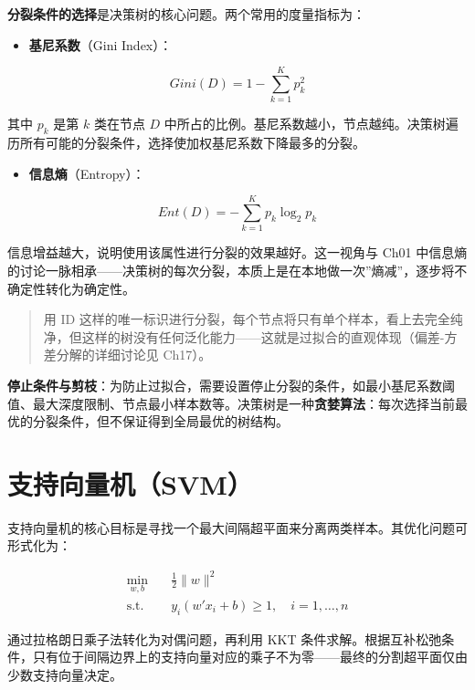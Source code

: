 \documentclass[
]{book}
\providecommand{\tightlist}{%
  \setlength{\itemsep}{0pt}\setlength{\parskip}{0pt}}
\begin{document}
\textbf{分裂条件的选择}是决策树的核心问题。两个常用的度量指标为：

\begin{itemize}
\tightlist
\item
  \textbf{基尼系数}（Gini Index）：
\end{itemize}

\[
Gini(D) = 1 - \sum_{k=1}^{K} p_k^2
\]

其中 \(p_k\) 是第 \(k\) 类在节点 \(D\) 中所占的比例。基尼系数越小，节点越纯。决策树遍历所有可能的分裂条件，选择使加权基尼系数下降最多的分裂。

\begin{itemize}
\tightlist
\item
  \textbf{信息熵}（Entropy）：
\end{itemize}

\[
Ent(D) = -\sum_{k=1}^{K} p_k \log_2 p_k
\]

信息增益越大，说明使用该属性进行分裂的效果越好。这一视角与 Ch01 中信息熵的讨论一脉相承------决策树的每次分裂，本质上是在本地做一次''熵减''，逐步将不确定性转化为确定性。

\begin{quote}
用 ID 这样的唯一标识进行分裂，每个节点将只有单个样本，看上去完全纯净，但这样的树没有任何泛化能力------这就是过拟合的直观体现（偏差-方差分解的详细讨论见 Ch17）。
\end{quote}

\textbf{停止条件与剪枝}：为防止过拟合，需要设置停止分裂的条件，如最小基尼系数阈值、最大深度限制、节点最小样本数等。决策树是一种\textbf{贪婪算法}：每次选择当前最优的分裂条件，但不保证得到全局最优的树结构。

\section{支持向量机（SVM）}\label{ux652fux6301ux5411ux91cfux673asvm}

支持向量机的核心目标是寻找一个最大间隔超平面来分离两类样本。其优化问题可形式化为：

\[
\begin{aligned}
\min_{w, b} \quad & \frac{1}{2} \|w\|^2 \\
\text{s.t.} \quad & y_i (w' x_i + b) \geq 1, \quad i = 1, \ldots, n
\end{aligned}
\]

通过拉格朗日乘子法转化为对偶问题，再利用 KKT 条件求解。根据互补松弛条件，只有位于间隔边界上的支持向量对应的乘子不为零------最终的分割超平面仅由少数支持向量决定。
\end{document}
